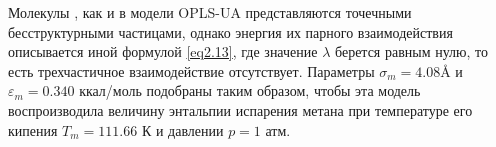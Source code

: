 Молекулы , как и в модели OPLS-UA представляются точечными бесструктурными частицами, однако энергия их парного взаимодействия описывается иной формулой \eqref{eq2.13}, где значение $\lambda$ берется равным нулю, то есть трехчастичное взаимодействие отсутствует. Параметры $\sigma_m=4.08 \si{\angstrom}$ и  $\varepsilon_m=0.340$ ккал/моль подобраны таким образом, чтобы эта модель воспроизводила величину энтальпии испарения метана при температуре его кипения $T_m=111.66$ К и давлении $p=1$ атм.